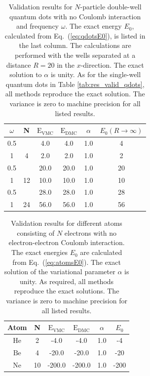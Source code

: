 \setlength{\tabcolsep}{0.8cm}
\begin{table}[h]
\begin{center}
\begin{tabular}{cc|cccc}
  $\omega$   & N & $\mathrm{E_{VMC}}$ & $\mathrm{E_{DMC}}$ & $\alpha$ & $E_0(R\to\infty)$ \\
\hline
  0.5  &       &   4.0   & 4.0   &   1.0    & 4   \\
  1    &   4   &   2.0   & 2.0   &   1.0    & 2   \\
  0.5  &       &   20.0  & 20.0  &   1.0    & 20  \\
  1    &   12  &   10.0  & 10.0  &   1.0    & 10  \\
  0.5  &       &   28.0  & 28.0  &   1.0    & 28   \\
  1    &   24  &   56.0  & 56.0  &   1.0    & 56   \\
\end{tabular}
\caption{Validation results for $N$-particle double-well quantum dots with no Coulomb interaction and frequency $\omega$. The exact energy $E_0$, calculated from  Eq.~(\ref{eq:qdotsE0}), is listed in the last column. The calculations are performed with the wells separated at a distance $R=20$ in the $x$-direction. The exact solution to $\alpha$ is unity. As for the single-well quantum dots in Table \ref{tab:res_valid_qdots}, all methods reproduce the exact solution. The variance is zero to machine precision for all listed results. }
\label{tab:res_valid_qdots_doublewell}
\end{center}
\end{table}
\setlength{\tabcolsep}{6pt}

\setlength{\tabcolsep}{0.8cm}
\begin{table}
\begin{center}
\begin{tabular}{cc|cccc}
 Atom &   N     & $\mathrm{E_{VMC}}$ & $\mathrm{E_{DMC}}$ & $\alpha$ & $E_0$\\
\hline
 $\mathrm{He}$ &   2     &   -4.0   &   -4.0   &   1.0  & -4  \\
 $\mathrm{Be}$ &   4     &  -20.0   &  -20.0   &   1.0  & -20 \\
 $\mathrm{Ne}$ &   10    &  -200.0  &  -200.0  &   1.0  & -200\\
\end{tabular}
\caption{Validation results for different atoms consisting of $N$ electrons with no electron-electron Coulomb interaction. The exact energies $E_0$ are calculated from Eq.~(\ref{eq:atomsE0}). The exact solution of the variational parameter $\alpha$ is unity. As required, all methods reproduce the exact solutions. The variance is zero to machine precision for all listed results.}
\label{tab:res_valid_atoms}
\end{center}
\end{table}
\setlength{\tabcolsep}{6pt}

